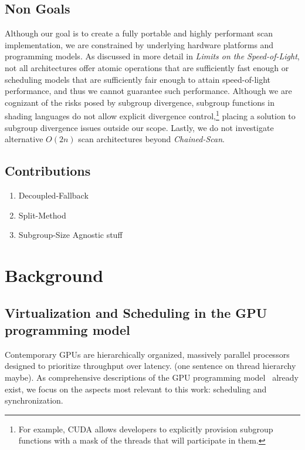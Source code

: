 \documentclass[sigconf]{acmart}
\begin{document}
\subsection{Non Goals}
Although our goal is to create a fully portable and highly performant scan implementation, we are constrained by underlying hardware platforms and programming models. As discussed in more detail in \emph{Limits on the Speed-of-Light}, not all architectures offer atomic operations that are sufficiently fast enough or scheduling models that are sufficiently fair enough to attain speed-of-light performance, and thus we cannot guarantee such performance. Although we are cognizant of the risks posed by subgroup divergence, subgroup functions in shading languages do not allow explicit divergence control,\footnote{For example, CUDA allows developers to explicitly provision subgroup functions with a mask of the threads that will participate in them.} placing a solution to subgroup divergence issues outside our scope. Lastly, we do not investigate alternative $O(2n)$ scan architectures beyond \emph{Chained-Scan}.

\subsection{Contributions}
\begin{enumerate}
  \item Decoupled-Fallback
  \item Split-Method
  \item Subgroup-Size Agnostic stuff
\end{enumerate}

\section{Background}
\subsection{Virtualization and Scheduling in the GPU programming model}
Contemporary GPUs are hierarchically organized, massively parallel processors designed to prioritize throughput over latency. (one sentence on thread hierarchy maybe). As comprehensive descriptions of the GPU programming model~\cite{} already exist, we focus on the aspects most relevant to this work: scheduling and synchronization.
\end{document}
